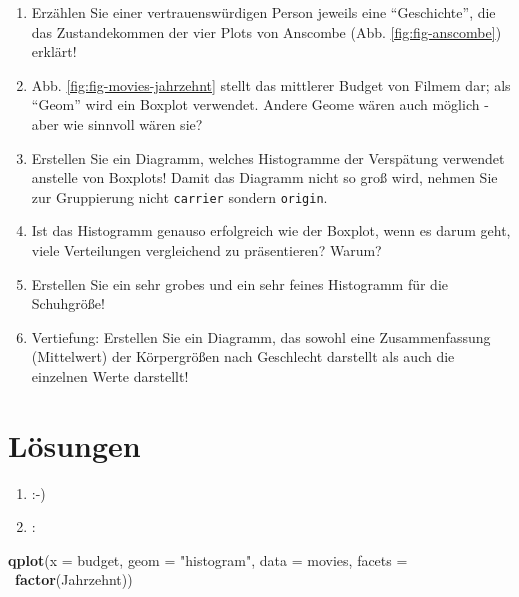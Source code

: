 \documentclass[12pt,ngerman,]{book}
\makeatletter
\newenvironment{Shaded}{\begin{snugshade}}{\end{snugshade}}
\newcommand{\KeywordTok}[1]{\textcolor[rgb]{0.13,0.29,0.53}{\textbf{{#1}}}}
\newcommand{\DataTypeTok}[1]{\textcolor[rgb]{0.13,0.29,0.53}{{#1}}}
\newcommand{\StringTok}[1]{\textcolor[rgb]{0.31,0.60,0.02}{{#1}}}
\newcommand{\NormalTok}[1]{{#1}}
\newenvironment{kframe}{%
\medskip{}
\setlength{\fboxsep}{.8em}
 \def\at@end@of@kframe{}%
 \ifinner\ifhmode%
  \def\at@end@of@kframe{\end{minipage}}%
  \begin{minipage}{\columnwidth}%
 \fi\fi%
 \def\FrameCommand##1{\hskip\@totalleftmargin \hskip-\fboxsep
 \colorbox{shadecolor}{##1}\hskip-\fboxsep
     \hskip-\linewidth \hskip-\@totalleftmargin \hskip\columnwidth}%
 \MakeFramed {\advance\hsize-\width
   \@totalleftmargin\z@ \linewidth\hsize
   \@setminipage}}%
 {\par\unskip\endMakeFramed%
 \at@end@of@kframe}
\renewenvironment{Shaded}{\begin{kframe}}{\end{kframe}}
\theoremstyle{definition}
\theoremstyle{definition}
\theoremstyle{remark}
\makeatother
\begin{document}
\begin{enumerate}
\def\labelenumi{\arabic{enumi}.}
\item
  Erzählen Sie einer vertrauenswürdigen Person jeweils eine
  ``Geschichte'', die das Zustandekommen der vier Plots von Anscombe
  (Abb. \ref{fig:fig-anscombe}) erklärt!
\item
  Abb. \ref{fig:fig-movies-jahrzehnt} stellt das mittlerer Budget von
  Filmem dar; als ``Geom'' wird ein Boxplot verwendet. Andere Geome
  wären auch möglich - aber wie sinnvoll wären sie?
\item
  Erstellen Sie ein Diagramm, welches Histogramme der Verspätung
  verwendet anstelle von Boxplots! Damit das Diagramm nicht so groß
  wird, nehmen Sie zur Gruppierung nicht \texttt{carrier} sondern
  \texttt{origin}.
\item
  Ist das Histogramm genauso erfolgreich wie der Boxplot, wenn es darum
  geht, viele Verteilungen vergleichend zu präsentieren? Warum?
\item
  Erstellen Sie ein sehr grobes und ein sehr feines Histogramm für die
  Schuhgröße!
\item
  Vertiefung: Erstellen Sie ein Diagramm, das sowohl eine
  Zusammenfassung (Mittelwert) der Körpergrößen nach Geschlecht
  darstellt als auch die einzelnen Werte darstellt!
\end{enumerate}

\section{Lösungen}\label{losungen}

\begin{enumerate}
\def\labelenumi{\arabic{enumi}.}
\item
  :-)
\item
  :
\end{enumerate}

\begin{Shaded}
\begin{Highlighting}[]
\KeywordTok{qplot}\NormalTok{(}\DataTypeTok{x =} \NormalTok{budget, }\DataTypeTok{geom =} \StringTok{"histogram"}\NormalTok{, }\DataTypeTok{data =} \NormalTok{movies, }\DataTypeTok{facets =} \NormalTok{~}\KeywordTok{factor}\NormalTok{(Jahrzehnt))}
\end{Highlighting}
\end{Shaded}
\end{document}
